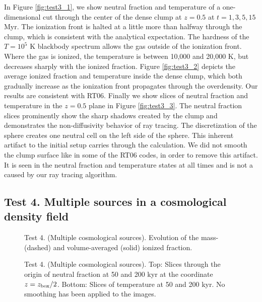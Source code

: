 \documentclass[12pt,preprint]{aastex}
\begin{document}
In Figure \ref{fig:test3_1}, we show neutral fraction and temperature
of a one-dimensional cut through the center of the dense clump at $z =
0.5$ at $t = 1, 3, 5, 15$ Myr.  The ionization front is halted at a
little more than halfway through the clump, which is consistent with
the analytical expectation.  The hardness of the $T = 10^5$ K
blackbody spectrum allows the gas outside of the ionization front.
Where the gas is ionized, the temperature is between 10,000 and 20,000
K, but decreases sharply with the ionized fraction.  Figure
\ref{fig:test3_2} depicts the average ionized fraction and temperature
inside the dense clump, which both gradually increase as the
ionization front propagates through the overdensity.  Our results are
consistent with RT06.  Finally we show slices of neutral fraction and
temperature in the $z = 0.5$ plane in Figure \ref{fig:test3_3}.  The
neutral fraction slices prominently show the sharp shadows created by
the clump and demonstrates the non-diffusivity behavior of ray
tracing.  The discretization of the sphere creates one neutral cell on
the left side of the sphere.  This inherent artifact to the initial
setup carries through the calculation.  We did not smooth the clump
surface like in some of the RT06 codes, in order to remove this
artifact.  It is seen in the neutral fraction and temperature states
at all times and is not a caused by our ray tracing algorithm.

\subsection{Test 4. Multiple sources in a cosmological density field}

\begin{figure}[t]
  \caption{\label{fig:test4_1} Test 4. (Multiple cosmological
    sources).  Evolution of the mass- (dashed) and volume-averaged
    (solid) ionized fraction.}
\end{figure}

\begin{figure}[t]
  \caption{\label{fig:test4_2} Test 4. (Multiple cosmological
    sources).  Top: Slices through the origin of neutral fraction at
    50 and 200 kyr at the coordinate $z = z_{\rm box}/2$.  Bottom:
    Slices of temperature at 50 and 200 kyr.  No smoothing has been
    applied to the images.}
\end{figure}
\end{document}
